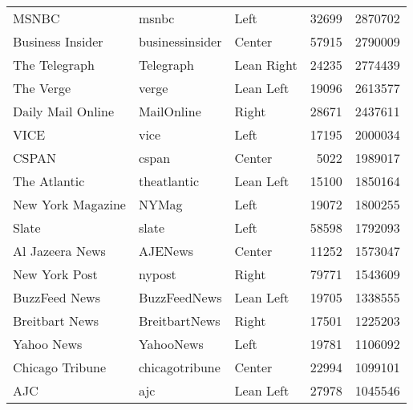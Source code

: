 \begin{center}
\begin{longtable}{lllrr}
                                    MSNBC &            msnbc &          Left &             32699 &    2870702 \\
                         Business Insider &  businessinsider &        Center &             57915 &    2790009 \\
                            The Telegraph &        Telegraph &    Lean Right &             24235 &    2774439 \\
                                The Verge &            verge &     Lean Left &             19096 &    2613577 \\
                        Daily Mail Online &       MailOnline &         Right &             28671 &    2437611 \\
                                     VICE &             vice &          Left &             17195 &    2000034 \\
                                    CSPAN &            cspan &        Center &              5022 &    1989017 \\
                             The Atlantic &      theatlantic &     Lean Left &             15100 &    1850164 \\
                        New York Magazine &            NYMag &          Left &             19072 &    1800255 \\
                                    Slate &            slate &          Left &             58598 &    1792093 \\
                          Al Jazeera News &          AJENews &        Center &             11252 &    1573047 \\
                            New York Post &           nypost &         Right &             79771 &    1543609 \\
                            BuzzFeed News &     BuzzFeedNews &     Lean Left &             19705 &    1338555 \\
                           Breitbart News &    BreitbartNews &         Right &             17501 &    1225203 \\
                               Yahoo News &        YahooNews &          Left &             19781 &    1106092 \\
                          Chicago Tribune &   chicagotribune &        Center &             22994 &    1099101 \\
                                      AJC &              ajc &     Lean Left &             27978 &    1045546 \\

\end{longtable}
\end{center}
